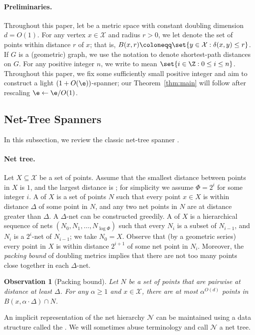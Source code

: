 \documentclass[11pt]{article}
\newtheorem{observation}[theorem]{Observation}
\newcommand{\cX}{\mathcal{X}}
\newcommand{\cN}{\mathcal{N}}
\newcommand{\dist}{\ensuremath{\delta}}
\newcommand{\ddim}{\ensuremath{d}}
\begin{document}
\paragraph{Preliminaries.} Throughout this paper, let \EMPH{$M = (\cX, \dist)$} be a metric space with constant doubling dimension $\ddim = O(1)$.
For any vertex $x \in \cX$ and radius $r > 0$, we let  denote the set of points within distance $r$ of $x$; that is, $B(x,r) \coloneqq \set{y \in \cX : \dist(x,y) \le r}$.
If $G$ is a (geometric) graph, we use the notation \EMPH{$\dist_G(\cdot,\cdot)$} to denote shortest-path distances on $G$. For any positive integer $n$, we write \EMPH{$[n]$} to mean $\set{i \in \Z: 0 \le i \le n}$. Throughout this paper, we fix some sufficiently small positive integer  and aim to construct a light $(1+O(\e))$-spanner; our Theorem~\ref{thm:main} will follow after rescaling $\e \gets \e / O(1)$.

\subsection{Net-Tree Spanners}

In this subsection, we review the classic net-tree spanner \cite{gao2004deformable}.

\paragraph{Net tree.}  Let $X \subseteq \cX$ be a set of points. Assume that the smallest distance between points in $X$ is $1$, and the largest distance is \EMPH{$\Phi$}; for simplicity we assume $\Phi = 2^i$ for some integer $i$.
A  of $X$ is a set of points $N$ such that every point $x \in X$ is within distance $\Delta$ of some point in $N$, and any two net points in $N$ are at distance greater than $\Delta$. A $\Delta$-net can be constructed greedily.
A  of $X$ is a hierarchical sequence of nets $(N_0, N_1, \ldots, N_{\log \Phi})$ such that every $N_i$ is a subset of $N_{i-1}$, and $N_i$ is a $2^{i}$-net of $N_{i-1}$;
we take $N_0 = X$. Observe that (by a geometric series) every point in $X$ is within distance $2^{i+1}$ of some net point in $N_i$. Moreover, the \emph{packing bound} of doubling metrics implies that there are not too many points close together in each $\Delta$-net.
\begin{observation}[Packing bound]
\label{obs:packing}
    Let $N$ be a set of points that are pairwise at distance at least $\Delta$. For any $\alpha \ge 1$ and $x \in \cX$, there are at most $\alpha^{O(\ddim)}$ points in $B(x,\alpha \cdot \Delta) \cap N$.
\end{observation}
% 
An implicit representation of the net hierarchy $\cN$ can be maintained using a data structure called the  \cite{gao2004deformable,KL04,HM06}.
We will sometimes abuse terminology and call $\cN$ a net tree.
\end{document}
